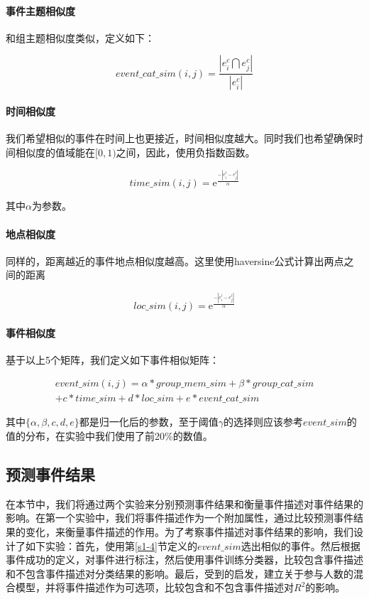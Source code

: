 \documentclass[12pt]{template}
\begin{document}
\paragraph{事件主题相似度}

和组主题相似度类似，定义如下：

\begin{equation}
event\_cat\_sim(i,j)=\frac{|e_i^c\bigcap e_j^c|}{|e_i^c|}
\end{equation}

\paragraph{时间相似度}

我们希望相似的事件在时间上也更接近，时间相似度越大。同时我们也希望确保时间相似度的值域能在\([0,1)\)之间，因此，使用负指数函数。

\begin{equation}   
time\_sim(i,j)=\mathrm{e}^\frac{-|e_i^t-e_j^t|}{\alpha}
\end{equation}

其中\(\alpha\)为参数。

\paragraph{地点相似度}

同样的，距离越近的事件地点相似度越高。这里使用haversine公式计算出两点之间的距离

\begin{equation}   
loc\_sim(i,j)=\mathrm{e}^\frac{-|e_i^l-e_j^l|}{\alpha}
\end{equation}

\paragraph{事件相似度}
基于以上5个矩阵，我们定义如下事件相似矩阵：

\begin{multline}   
event\_sim(i,j)=\alpha*group\_mem\_sim+\beta*group\_cat\_sim
\\+{c}*time\_sim+{d}*loc\_sim+{e}*event\_cat\_sim
\end{multline}

其中\(\{\alpha,\beta,{c},{d},{e}\}\)都是归一化后的参数，至于阈值\(\gamma\)的选择则应该参考\(event\_sim\)的值的分布，在实验中我们使用了前20\%的数值。

\subsection{预测事件结果}
在本节中，我们将通过两个实验来分别预测事件结果和衡量事件描述对事件结果的影响。在第一个实验中，我们将事件描述作为一个附加属性，通过比较预测事件结果的变化，来衡量事件描述的作用。为了考察事件描述对事件结果的影响，我们设计了如下实验：首先，使用第\ref{s1-4}节定义的\(event\_sim\)选出相似的事件。然后根据事件成功的定义，对事件进行标注，然后使用事件训练分类器，比较包含事件描述和不包含事件描述对分类结果的影响。最后，受到\citep{noauthor_predicting_nodate}的启发，建立关于参与人数的混合模型，并将事件描述作为可选项，比较包含和不包含事件描述对\(R^2\)的影响。
\end{document}
